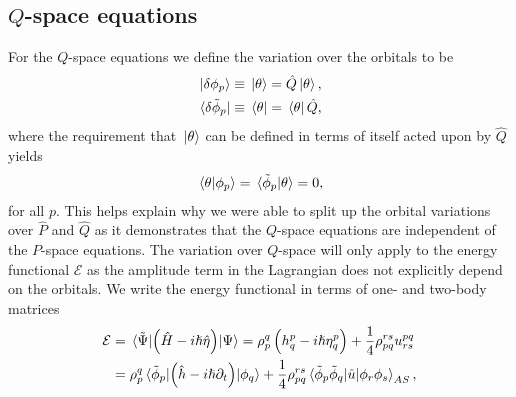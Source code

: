         \subsection{$Q$-space equations}
            For the $Q$-space equations we define the variation over the
            orbitals to be
            \begin{gather}
                \ket*{\delta\phi_p}
                \equiv \ket*{\theta}
                = \hat{Q}\ket*{\theta},
                \\
                \bra*{\delta\tilde{\phi}_p}
                \equiv \bra*{\theta}
                = \bra*{\theta}\hat{Q},
            \end{gather}
            where the requirement that $\ket*{\theta}$ can be defined in terms
            of itself acted upon by $\hat{Q}$ yields
            \begin{align}
                \braket*{\theta}{\phi_p}
                = \braket*{\tilde{\phi}_p}{\theta}
                = 0,
            \end{align}
            for all $p$.
            This helps explain why we were able to split up the orbital
            variations over $\hat{P}$ and $\hat{Q}$ as it demonstrates that the
            $Q$-space equations are independent of the $P$-space equations.
            The variation over $Q$-space will only apply to the energy
            functional $\mathcal{E}$ as the amplitude term in the Lagrangian
            does not explicitly depend on the orbitals.
            We write the energy functional in terms of one- and two-body
            matrices
            \begin{align}
                \mathcal{E}
                &= \mel*{\tilde{\Psi}}{
                    \left( 
                        \hat{H} - i\hslash\hat{\eta}
                     \right)
                }{\Psi}
                =
                \rho^{q}_{p}\left( 
                    h^{p}_{q}
                    - i\hslash\eta^{p}_{q}
                 \right)
                + \frac{1}{4}\rho^{rs}_{pq}
                u^{pq}_{rs}
                \\
                &= \rho^{q}_{p}
                \mel*{\tilde{\phi}_p}{
                    \left( 
                        \hat{h}
                        - i\hslash\partial_t
                     \right)
                }{\phi_{q}}
                +
                \frac{1}{4}\rho^{rs}_{pq}
                \mel*{\tilde{\phi}_p\tilde{\phi}_q}{
                    \hat{u}
                }{\phi_r\phi_s}_{AS},
            \end{align}

